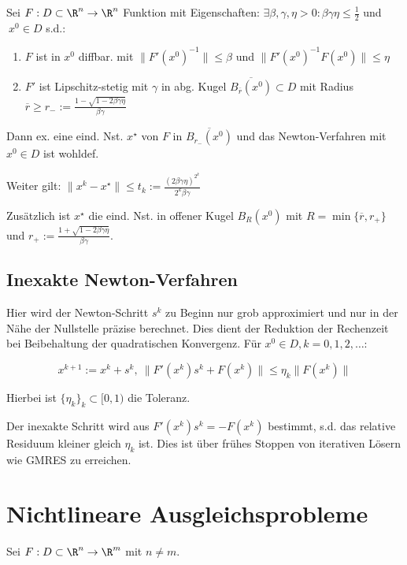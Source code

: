 Sei $F : D \subset \R^n \to \R^n$ Funktion mit Eigenschaften: $\exists \beta, \gamma, \eta > 0 : \beta\gamma\eta \leq \frac{1}{2}$ und $\ x^0 \in D$ s.d.:

\begin{enumerate}[label=(\roman*)]
	\item $F$ ist in $x^0$ diffbar. mit $\|F'(x^0)^{-1}\| \leq \beta$ und $\|F'(x^0)^{-1}F(x^0)\| \leq \eta$
	\item $F'$ ist Lipschitz-stetig mit $\gamma$ in abg. Kugel $\overline{B_{\overline r}(x^0)} \subset D$ mit Radius $\overline r \geq r_- := \frac{1-\sqrt{1-2\beta\gamma\eta}}{\beta\gamma}$
\end{enumerate}

Dann ex. eine eind. Nst. $x^\star$ von $F$ in $\overline{B_{r_-}(x^0)}$ und das Newton-Verfahren mit $x^0 \in D$ ist wohldef.

Weiter gilt: $\|x^k-x^\star\| \leq t_k := \frac{(2\beta\gamma\eta)^{2^k}}{2^k\beta\gamma}$

Zusätzlich ist $x^\star$ die eind. Nst. in offener Kugel $B_R(x^0)$ mit $R=\min\{\overline r,r_+\}$ und $r_+ := \frac{1+\sqrt{1-2\beta\gamma\eta}}{\beta\gamma}$.

\subsection*{Inexakte Newton-Verfahren}

Hier wird der Newton-Schritt $s^k$ zu Beginn nur grob approximiert und nur in der Nähe der Nullstelle präzise berechnet. Dies dient der Reduktion der Rechenzeit bei Beibehaltung der quadratischen Konvergenz. Für $x^0 \in D, k = 0,1,2,\dots$:

\vspace*{-4mm}
\[ x^{k+1} := x^k + s^k, \ \|F'(x^k)s^k + F(x^k)\| \leq \eta_k \|F(x^k)\| \]

Hierbei ist $\{\eta_k\}_k \subset [0,1)$ die Toleranz.

Der inexakte Schritt wird aus $F'(x^k)s^k = -F(x^k)$ bestimmt, s.d. das relative Residuum kleiner gleich $\eta_k$ ist. Dies ist über frühes Stoppen von iterativen Lösern wie GMRES zu erreichen.

\section*{Nichtlineare Ausgleichsprobleme}

Sei $F : D \subset \R^n \to \R^m$ mit $n \neq m$.

